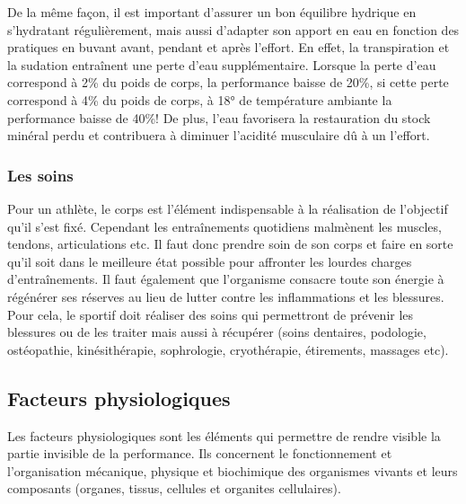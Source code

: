                     
                    De la même façon, il est important d’assurer un bon équilibre hydrique en s'hydratant régulièrement, mais aussi d'adapter son apport en eau en fonction des pratiques en buvant avant, pendant et après l’effort. En effet, la transpiration et la sudation entraînent une perte d'eau supplémentaire. Lorsque la perte d’eau correspond à 2\% du poids de corps, la performance baisse de 20\%, si cette perte correspond à 4\% du poids de corps, à 18° de température ambiante la performance baisse de 40\%!  De plus, l'eau favorisera la restauration du stock minéral perdu et contribuera à diminuer l’acidité musculaire dû à un l'effort.
    
             
                \subsubsection{Les soins}
       
                    Pour un athlète, le corps est l'élément indispensable à la réalisation de l’objectif qu’il s’est fixé. Cependant les entraînements quotidiens malmènent les muscles, tendons, articulations etc.  Il faut donc prendre soin de son corps et faire en sorte qu'il soit dans le meilleure état possible pour affronter les lourdes charges d'entraînements. Il faut également que l'organisme consacre toute son énergie à régénérer ses réserves au lieu de lutter contre les inflammations et les blessures.\\
                    
                    Pour cela, le sportif doit réaliser des soins qui permettront de prévenir les blessures ou de les traiter mais aussi à récupérer (soins dentaires, podologie, ostéopathie, kinésithérapie, sophrologie, cryothérapie, étirements, massages etc).
        
                
        \vspace{10pt}        
                
        \subsection{Facteurs physiologiques}
        
        Les facteurs physiologiques sont les éléments qui permettre de rendre visible la partie invisible de la performance.
        Ils concernent le fonctionnement et l'organisation mécanique, physique et biochimique des organismes vivants et leurs composants (organes, tissus, cellules et organites cellulaires).
        
